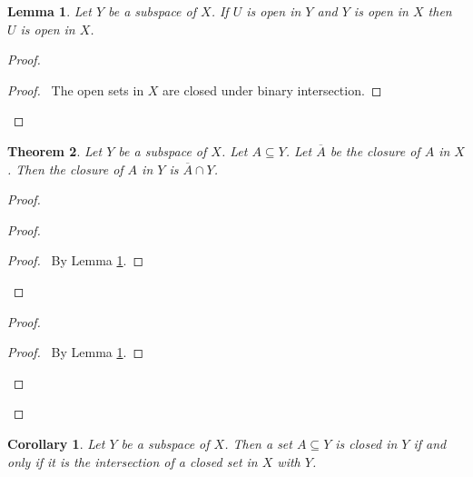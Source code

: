 \documentclass{report}
\let\qed\relax
\newtheorem{lm}{Lemma}[section]
\newtheorem{thm}[lm]{Theorem}
\newtheorem{cor}{Corollary}[lm]
\theoremstyle{definition}
\begin{document}
  \begin{lm}
    \label{lm:topology:subspace:open}
    Let $Y$ be a subspace of $X$. If $U$ is open in $Y$ and $Y$ is open in $X$
    then $U$ is open in $X$.
  \end{lm}

  \begin{proof}
    \pf
    \begin{proof}
      \pf\ The open sets in $X$ are closed under binary intersection.
    \end{proof}
    \qed
  \end{proof}

  \begin{thm}
    \label{thm:topology:subspace:closure}
    Let $Y$ be a subspace of $X$. Let $A \subseteq Y$. Let $\overline{A}$ be
    the
    closure of $A$ in $X$. Then the closure of $A$ in $Y$ is $\overline{A} \cap
    Y$.
  \end{thm}

  \begin{proof}
    \pf
    \begin{proof}
      \begin{proof}
        \pf\ By Lemma \ref{cor:topology:subspace:closed}.
      \end{proof}
    \end{proof}
    \begin{proof}
      \begin{proof}
        \pf\ By Lemma \ref{cor:topology:subspace:closed}.
      \end{proof}
    \end{proof}
    \qed
  \end{proof}

  \begin{cor}
    \label{cor:topology:subspace:closed}
    Let $Y$ be a subspace of $X$. Then a set $A \subseteq Y$ is closed in $Y$
    if
    and only if it is the intersection of a closed set in $X$ with $Y$.
  \end{cor}
\end{document}

